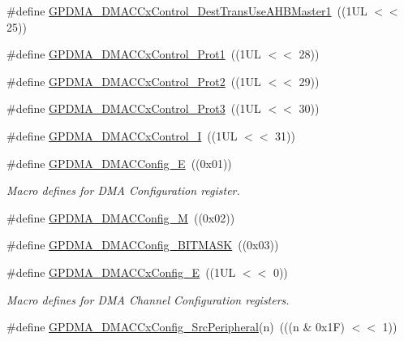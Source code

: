\begin{DoxyCompactItemize}
\item 
\#define \hyperlink{group___g_p_d_m_a__18_x_x__43_x_x_gacd71734a295849633110d6c64edda70c}{G\+P\+D\+M\+A\+\_\+\+D\+M\+A\+C\+Cx\+Control\+\_\+\+Dest\+Trans\+Use\+A\+H\+B\+Master1}~((1\+U\+L $<$$<$ 25))
\item 
\#define \hyperlink{group___g_p_d_m_a__18_x_x__43_x_x_ga883ee41e16f8df248437075cebab7993}{G\+P\+D\+M\+A\+\_\+\+D\+M\+A\+C\+Cx\+Control\+\_\+\+Prot1}~((1\+U\+L $<$$<$ 28))
\item 
\#define \hyperlink{group___g_p_d_m_a__18_x_x__43_x_x_gabe38faff26ee3951122c23ff1425d70a}{G\+P\+D\+M\+A\+\_\+\+D\+M\+A\+C\+Cx\+Control\+\_\+\+Prot2}~((1\+U\+L $<$$<$ 29))
\item 
\#define \hyperlink{group___g_p_d_m_a__18_x_x__43_x_x_gaf6a439bbf5a4b082fa7f36effca23f15}{G\+P\+D\+M\+A\+\_\+\+D\+M\+A\+C\+Cx\+Control\+\_\+\+Prot3}~((1\+U\+L $<$$<$ 30))
\item 
\#define \hyperlink{group___g_p_d_m_a__18_x_x__43_x_x_ga6ef0b54b0190c139796679d6db1e6e19}{G\+P\+D\+M\+A\+\_\+\+D\+M\+A\+C\+Cx\+Control\+\_\+I}~((1\+U\+L $<$$<$ 31))
\item 
\#define \hyperlink{group___g_p_d_m_a__18_x_x__43_x_x_ga253822f2712564a42379a76d9447cde4}{G\+P\+D\+M\+A\+\_\+\+D\+M\+A\+C\+Config\+\_\+E}~((0x01))
\begin{DoxyCompactList}\small\item\em Macro defines for D\+MA Configuration register. \end{DoxyCompactList}\item 
\#define \hyperlink{group___g_p_d_m_a__18_x_x__43_x_x_ga0f2a7e8c8704f5a897f911ac3a8617e3}{G\+P\+D\+M\+A\+\_\+\+D\+M\+A\+C\+Config\+\_\+M}~((0x02))
\item 
\#define \hyperlink{group___g_p_d_m_a__18_x_x__43_x_x_gad882001a1a177628f45ffa5a57a2c894}{G\+P\+D\+M\+A\+\_\+\+D\+M\+A\+C\+Config\+\_\+\+B\+I\+T\+M\+A\+SK}~((0x03))
\item 
\#define \hyperlink{group___g_p_d_m_a__18_x_x__43_x_x_ga1c7608bb37d512277e42672ee4e785a5}{G\+P\+D\+M\+A\+\_\+\+D\+M\+A\+C\+Cx\+Config\+\_\+E}~((1\+U\+L $<$$<$ 0))
\begin{DoxyCompactList}\small\item\em Macro defines for D\+MA Channel Configuration registers. \end{DoxyCompactList}\item 
\#define \hyperlink{group___g_p_d_m_a__18_x_x__43_x_x_gaccb73c66c5349ec79a3f332d77554f0c}{G\+P\+D\+M\+A\+\_\+\+D\+M\+A\+C\+Cx\+Config\+\_\+\+Src\+Peripheral}(n)~(((n \& 0x1\+F) $<$$<$ 1))
$$
\end{DoxyCompactItemize}
